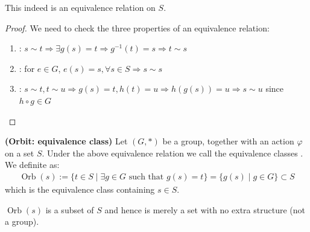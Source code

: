 \documentclass{article}
\newcommand{\bfs}[1]{\textbf{({#1}) }}
\newcommand{\Orb}{\operatorname{Orb}}
\begin{document}
\begin{lema}
This indeed is an equivalence relation on $S$.
\end{lema} 
\begin{proof}
We need to check the three properties of an equivalence relation:
\begin{enumerate}
    \item {}: $s \sim t \Rightarrow \exists g(s)= t \Rightarrow  g^{-1}(t)=s \Rightarrow t\sim s$
    \item {}: for $e \in G$, $e(s)=s, \forall s\in S \Rightarrow s \sim s$
    \item {}: $s \sim t, t \sim u \Rightarrow  g(s)= t, h(t)=u\Rightarrow h(g(s))= u\Rightarrow s\sim u$ since $h\circ g\in G$
\end{enumerate}
\end{proof}

\begin{defa}{\bfs{Orbit: equivalence class}}
  Let $(G, *)$ be a group, together with an action $\varphi$ on a set $S .$ Under the above equivalence relation we call the equivalence classes . We definite  as:
\begin{align*}
\Orb(s):=\{t \in S \mid \exists g \in G \text { such that } g(s)=t\}=\{g(s)\mid g\in G\} \subset S
\end{align*}
which is the equivalence class containing $s \in S .$
\end{defa} 
\begin{rema}
 $\Orb(s)$ is a subset of $S$ and hence is merely a set with no extra structure (not a group).
\end{rema}
\end{document}
